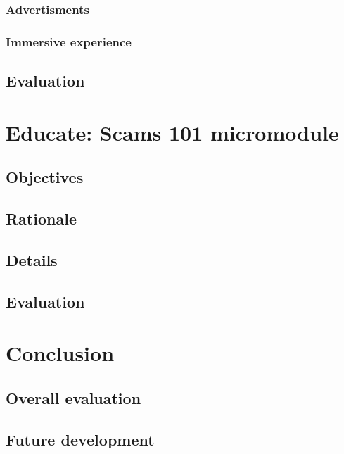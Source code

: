 \documentclass[a4paper]{article}
\begin{document}
\subsubsection{Advertisments}
\subsubsection{Immersive experience}
\subsection{Evaluation}

\section{Educate: Scams 101 micromodule}
\subsection{Objectives}
\subsection{Rationale}
\subsection{Details}
\subsection{Evaluation}

\section{Conclusion}
\subsection{Overall evaluation}
\subsection{Future development}

\newpage

\nocite{*} \printbibliography[heading=bibintoc,title={References}]

\newpage


\begin{appendices}
\end{appendices}


\end{document}
